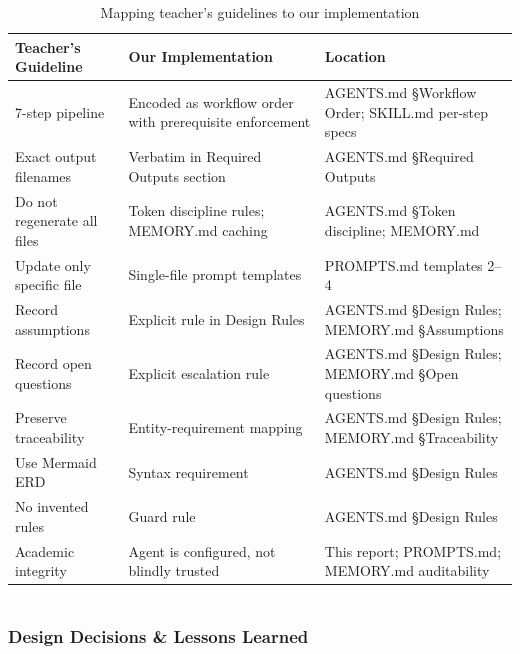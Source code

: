 \documentclass[12pt,a4paper]{article}
\begin{document}
\begin{table}[h]
\centering
\begin{tabular}{|p{4cm}|p{4cm}|p{4cm}|}
\hline
\textbf{Teacher's Guideline} & \textbf{Our Implementation} & \textbf{Location} \\
\hline
7-step pipeline & Encoded as workflow order with prerequisite enforcement & AGENTS.md \S Workflow Order; SKILL.md per-step specs \\
\hline
Exact output filenames & Verbatim in Required Outputs section & AGENTS.md \S Required Outputs \\
\hline
Do not regenerate all files & Token discipline rules; MEMORY.md caching & AGENTS.md \S Token discipline; MEMORY.md \\
\hline
Update only specific file & Single-file prompt templates & PROMPTS.md templates 2--4 \\
\hline
Record assumptions & Explicit rule in Design Rules & AGENTS.md \S Design Rules; MEMORY.md \S Assumptions \\
\hline
Record open questions & Explicit escalation rule & AGENTS.md \S Design Rules; MEMORY.md \S Open questions \\
\hline
Preserve traceability & Entity-requirement mapping & AGENTS.md \S Design Rules; MEMORY.md \S Traceability \\
\hline
Use Mermaid ERD & Syntax requirement & AGENTS.md \S Design Rules \\
\hline
No invented rules & Guard rule & AGENTS.md \S Design Rules \\
\hline
Academic integrity & Agent is configured, not blindly trusted & This report; PROMPTS.md; MEMORY.md auditability \\
\hline
\end{tabular}
\caption{Mapping teacher's guidelines to our implementation}
\end{table}

\newpage


\part*{} %

\section{Design Decisions \& Lessons Learned}
\end{document}
